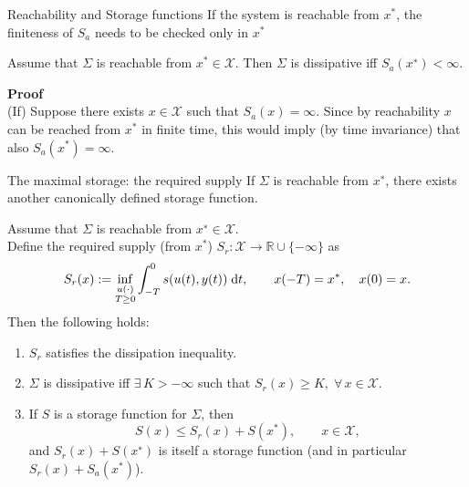 \documentclass[aspectratio=169]{beamer}
\newcommand{\bbR}{\mathbb{R}}
\begin{document}
\begin{frame}{Reachability and Storage functions}
If the system is reachable from $x^*$, the finiteness of $S_a$ needs to be checked only in $x^*$
\begin{theorem}
	Assume that $\Sigma$ is reachable from $x^* \in \mathcal{X}$. Then $\Sigma$ is dissipative
	iff $S_a (x^∗) < \infty$.
\end{theorem}

\textbf{Proof} \\
(If) Suppose there exists $x \in \mathcal{X}$ such that $S_a(x) = \infty$. Since
by reachability $x$  can be reached from $x^*$ in finite time, this would imply (by time
invariance) that also $S_a(x^*) = \infty$.


\end{frame}

\begin{frame}{The maximal storage: the required supply}
	If $\Sigma$ is reachable from $x^∗$, there
	exists another canonically defined storage function. 
\begin{theorem}
	Assume that $\Sigma$ is reachable from $x^∗ \in \mathcal{X}$. \\
	Define the required supply (from $x^*$) $S_r : \mathcal{X} \rightarrow \bbR \cup \{-\infty\}$ as
\begin{equation}\label{eq:Sr}
	S_r(x) := \inf_{\substack{u(\cdot) \\ T \ge 0}} \int_{-T}^0 s(u(t), y(t)) \d t, \qquad x(-T)=x^*, \quad x(0)=x.
\end{equation}
Then the following holds:
\begin{enumerate}
	\item $S_r$ satisfies the dissipation inequality. 
	\item $\Sigma$ is dissipative iff $\exists\, K > −\infty$ such that $S_r (x) \ge K, \; \forall \, x \in \mathcal{X}$.
	\item If $S$ is a 	storage function for $\Sigma$, then
	\begin{equation*}
		S(x) \le S_r(x) + S(x^*), \qquad x \in \mathcal{X},
	\end{equation*}
	and $S_r(x) + S(x^∗)$ is itself a storage function (and in particular $S_r(x) + S_a(x^*)$). 
\end{enumerate}


\end{theorem}
\end{frame}
\end{document}
